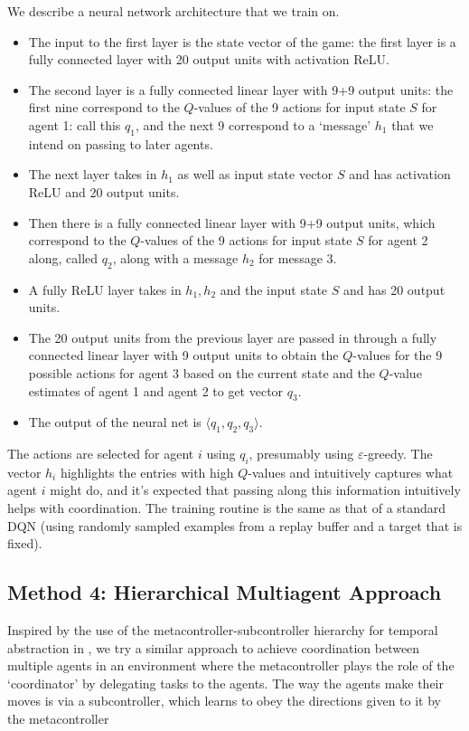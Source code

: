 \documentclass{article}
\begin{document}
We describe a neural network architecture that we train
on.
\begin{itemize}

\item The input to the first layer is the state vector of
the game: the first layer is a fully connected layer
with 20 output units with activation ReLU.

\item The second layer is a fully connected linear layer
with 9+9 output units: the first nine correspond to the $Q$-values
of the 9 actions for input state $S$ for agent 1: call
this $q_1$, and the next 9 correspond to a `message' $h_1$ that
we intend on passing to later agents.

\item The next layer takes in $h_1$ as well as input
state vector $S$ and has activation ReLU and 20 output
units.

\item Then there is a fully connected linear layer with
9+9 output units, which correspond to the $Q$-values
of the 9 actions for input state $S$ for agent 2
along, called $q_2$, along with a message $h_2$
for message 3.

\item A fully ReLU layer takes in $h_1, h_2$ and the input
state $S$ and has 20 output units. 

\item The 20 output units from the previous layer are
passed in through a fully connected linear layer with
9 output units to obtain the $Q$-values for the 9
possible actions for agent 3 based on the current state
and the $Q$-value estimates of agent 1 and agent 2
to get vector $q_3$.

\item The output of the neural net is $\langle q_1,q_2,q_3
\rangle$.

\end{itemize}

The actions are selected for agent $i$ using $q_i$,
presumably using $\varepsilon$-greedy.
The vector $h_i$ highlights the entries with
high $Q$-values and intuitively captures
what agent $i$ might do, and it's expected that
passing along this information intuitively helps
with coordination. The training routine is the same as that
of a standard DQN (using randomly sampled examples from
a replay buffer and a target that is fixed).

\subsection{Method 4: Hierarchical Multiagent Approach}
Inspired by the use of the metacontroller-subcontroller
hierarchy for temporal abstraction in \cite{kulkarni2016hierarchical}, we try a similar approach
to achieve coordination between multiple agents in an
environment where the metacontroller plays the role of the `coordinator' by delegating
tasks to the agents. The way the agents make their moves is via a subcontroller,
which learns to obey the directions given to it by the metacontroller
\end{document}
